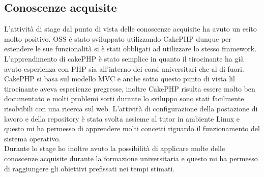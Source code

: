 \subsection{Conoscenze acquisite}
L'attività di stage dal punto di vista delle conoscenze acquisite ha avuto un esito molto positivo.
OSS è stato sviluppato utilizzando CakePHP dunque per estendere le sue funzionalità si è stati obbligati ad utilizzare lo stesso framework. L'apprendimento di cakePHP è stato semplice in quanto il tirocinante ha già avuto esperienza con PHP sia all'interno dei corsi universitari che al di fuori. CakePHP si basa sul modello MVC e anche sotto questo punto di vista lil tirocinante aveva esperienze pregresse, inoltre CakePHP risulta essere molto ben documentato e molti problemi sorti durante lo sviluppo sono stati facilmente risolvibili con una ricerca sul web. 
L'attività di configurazione della postazione di lavoro e della repository è stata svolta assieme al tutor in ambiente Linux e questo mi ha permesso di apprendere molti concetti riguardo il funzionamento del sistema operativo. \\

Durante lo stage ho inoltre avuto la possibilità di applicare molte delle conoscenze acquisite durante la formazione universitaria e questo mi ha permesso di raggiungere gli obiettivi prefissati nei tempi stimati.

